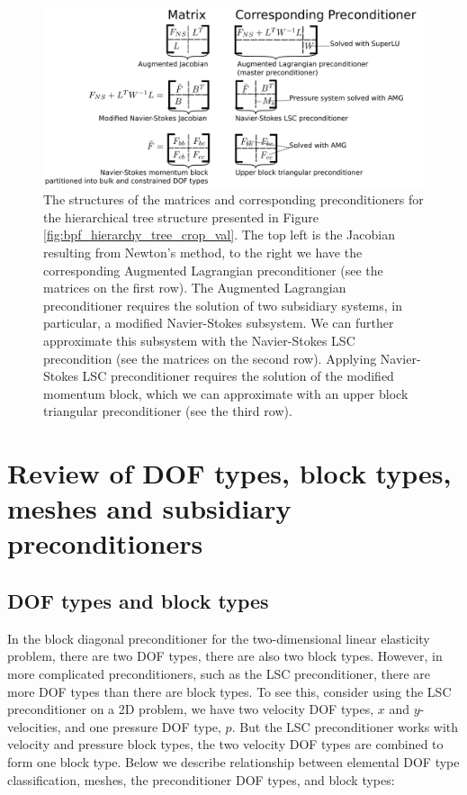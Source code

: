 \begin{figure}[H]
\centering
\includegraphics[width=1\textwidth]{./pic/bpf_hierarchy_matrixstructure_crop.pdf}
\caption{The structures of the matrices and corresponding preconditioners for
  the hierarchical tree structure presented in Figure
  \ref{fig:bpf_hierarchy_tree_crop_val}. The top left is the Jacobian resulting
  from Newton's method, to the right we have the corresponding Augmented
  Lagrangian preconditioner (see the matrices on the first row). The Augmented
  Lagrangian preconditioner requires the solution of two subsidiary systems, in
  particular, a modified Navier-Stokes subsystem. We can further approximate
  this subsystem with the Navier-Stokes LSC precondition (see the matrices on
  the second row). Applying Navier-Stokes LSC preconditioner requires the
  solution of the modified momentum block, which we can approximate with an
  upper block triangular preconditioner (see the third row).}
\label{fig:bpf_hierarchy_matrixstructure_crop_val}
\end{figure}


\section{Review of DOF types, block types, meshes and subsidiary preconditioners}


\subsection{DOF types and block types\label{sec:dof_types_and_block_types}}
In the block diagonal preconditioner for the two-dimensional linear elasticity 
problem, there are two DOF types, there are also two block types. However, in 
more complicated preconditioners, such as the LSC preconditioner, there are 
more DOF types than there are block types. To see this, consider  using the 
LSC preconditioner on a 2D problem, we have two velocity DOF types, $x$ and 
$y$-velocities, and one pressure DOF type, $p$. But the LSC preconditioner 
works with velocity and pressure block types, the two velocity DOF types are 
combined to form one block type. Below we describe relationship between 
elemental DOF type classification, meshes, the preconditioner DOF types, 
and block types:

